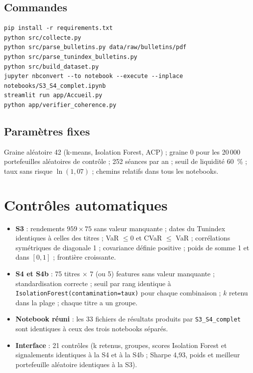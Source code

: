 \documentclass[11pt,a4paper]{article}
\newcommand{\pc}{~\%}
\begin{document}
\subsection*{Commandes}
{\footnotesize\begin{verbatim}
pip install -r requirements.txt
python src/collecte.py
python src/parse_bulletins.py data/raw/bulletins/pdf
python src/parse_tunindex_bulletins.py
python src/build_dataset.py
jupyter nbconvert --to notebook --execute --inplace notebooks/S3_S4_complet.ipynb
streamlit run app/Accueil.py
python app/verifier_coherence.py
\end{verbatim}}

\subsection*{Paramètres fixes}
Graine aléatoire 42 (k-means, Isolation Forest, ACP) ; graine 0 pour les 20\,000 portefeuilles aléatoires de contrôle ; 252 séances par an ; seuil de liquidité 60\pc{} ; taux sans risque $\ln(1{,}07)$ ; chemins relatifs dans tous les notebooks.

\section{Contrôles automatiques}\label{ann:controles}
\begin{itemize}
  \item \textbf{S3} : rendements $959 \times 75$ sans valeur manquante ; dates du Tunindex identiques à celles des titres ; VaR $\leq 0$ et CVaR $\leq$ VaR ; corrélations symétriques de diagonale 1 ; covariance définie positive ; poids de somme 1 et dans $[0,1]$ ; frontière croissante.
  \item \textbf{S4 et S4b} : 75 titres $\times$ 7 (ou 5) features sans valeur manquante ; standardisation correcte ; seuil par rang identique à \texttt{IsolationForest(contamination=taux)} pour chaque combinaison ; $k$ retenu dans la plage ; chaque titre a un groupe.
  \item \textbf{Notebook réuni} : les 33 fichiers de résultats produits par \texttt{S3\_S4\_complet} sont identiques à ceux des trois notebooks séparés.
  \item \textbf{Interface} : 21 contrôles (k retenus, groupes, scores Isolation Forest et signalements identiques à la S4 et à la S4b ; Sharpe 4,93, poids et meilleur portefeuille aléatoire identiques à la S3).
\end{itemize}
\end{document}
